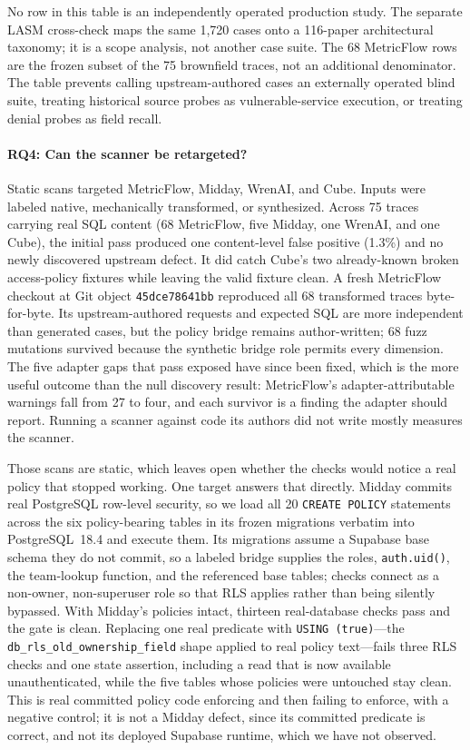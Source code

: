 No row in this table is an independently operated production study. The separate LASM cross-check maps the same 1,720 cases onto a 116-paper architectural taxonomy; it is a scope analysis, not another case suite. The 68 MetricFlow rows are the frozen subset of the 75 brownfield traces, not an additional denominator. The table prevents calling upstream-authored cases an externally operated blind suite, treating historical source probes as vulnerable-service execution, or treating denial probes as field recall.

\paragraph{RQ4: Can the scanner be retargeted?}
Static scans targeted MetricFlow, Midday, WrenAI, and Cube. Inputs were labeled native, mechanically transformed, or synthesized. Across 75 traces carrying real SQL content (68 MetricFlow, five Midday, one WrenAI, and one Cube), the initial pass produced one content-level false positive (1.3\%) and no newly discovered upstream defect. It did catch Cube's two already-known broken access-policy fixtures while leaving the valid fixture clean. A fresh MetricFlow checkout at Git object \texttt{45dce78641bb} reproduced all 68 transformed traces byte-for-byte. Its upstream-authored requests and expected SQL are more independent than generated cases, but the policy bridge remains author-written; 68 fuzz mutations survived because the synthetic bridge role permits every dimension. The five adapter gaps that pass exposed have since been fixed, which is the more useful outcome than the null discovery result: MetricFlow's adapter-attributable warnings fall from 27 to four, and each survivor is a finding the adapter should report. Running a scanner against code its authors did not write mostly measures the scanner.

Those scans are static, which leaves open whether the checks would notice a real policy that stopped working. One target answers that directly. Midday commits real PostgreSQL row-level security, so we load all 20 \texttt{CREATE POLICY} statements across the six policy-bearing tables in its frozen migrations verbatim into PostgreSQL~18.4 and execute them. Its migrations assume a Supabase base schema they do not commit, so a labeled bridge supplies the roles, \texttt{auth.uid()}, the team-lookup function, and the referenced base tables; checks connect as a non-owner, non-superuser role so that RLS applies rather than being silently bypassed. With Midday's policies intact, thirteen real-database checks pass and the gate is clean. Replacing one real predicate with \texttt{USING (true)}---the \texttt{db\_rls\_old\_ownership\_field} shape applied to real policy text---fails three RLS checks and one state assertion, including a read that is now available unauthenticated, while the five tables whose policies were untouched stay clean. This is real committed policy code enforcing and then failing to enforce, with a negative control; it is not a Midday defect, since its committed predicate is correct, and not its deployed Supabase runtime, which we have not observed.

